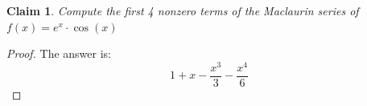 \documentclass{article}
\newtheorem{theorem}{Claim}
\begin{document}
\begin{theorem}
Compute the first 4 nonzero terms of the Maclaurin series of $f(x) = e^x \cdot \cos(x)$
\end{theorem}

\begin{proof}
The answer is:
\[
1+x-\frac{x^3}{3}-\frac{x^4}{6}
\]
\end{proof}
\end{document}

